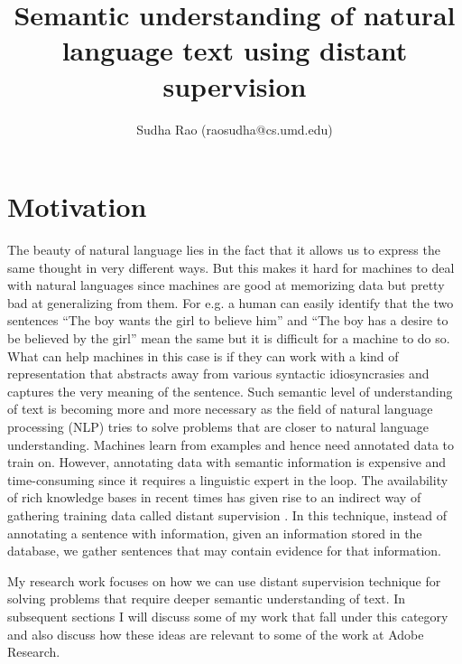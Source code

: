 \documentclass[11pt,a4paper]{article}
\title{Semantic understanding of natural language text using distant supervision}
\author{Sudha Rao (raosudha@cs.umd.edu)}
\date{}
\begin{document}
\maketitle

\section{Motivation}

The beauty of natural language lies in the fact that it allows us to express the same thought in very different ways. But this makes it hard for machines to deal with natural languages since machines are good at memorizing data but pretty bad at generalizing from them. For e.g. a human can easily identify that the two sentences ``The boy wants the girl to believe him'' and ``The boy has a desire to be believed by the girl'' mean the same but it is difficult for a machine to do so. What can help machines in this case is if they can work with a kind of representation that abstracts away from various syntactic idiosyncrasies and captures the very meaning of the sentence. Such semantic level of understanding of text is becoming more and more necessary as the field of natural language processing (NLP) tries to solve problems that are closer to natural language understanding. Machines learn from examples and hence need annotated data to train on. However, annotating data with semantic information is expensive and time-consuming since it requires a linguistic expert in the loop. The availability of rich knowledge bases in recent times has given rise to an indirect way of gathering training data called distant supervision \cite{mintz2009distant}. In this technique, instead of annotating a sentence with information, given an information stored in the database, we gather sentences that may contain evidence for that information. 

My research work focuses on how we can use distant supervision technique for solving problems that require deeper semantic understanding of text. In subsequent sections I will discuss some of my work that fall under this category and also discuss how these ideas are relevant to some of the work at Adobe Research.
\end{document}
